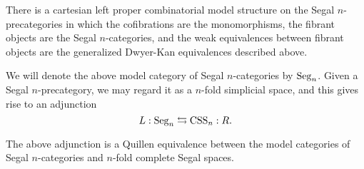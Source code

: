\documentclass{amsart}
\begin{document}
\begin{theorem} %
	There is a cartesian left proper combinatorial model structure on the Segal $n$-precategories in which the cofibrations are the monomorphisms, the fibrant objects are the Segal $n$-categories, and the weak equivalences between fibrant objects are the generalized Dwyer-Kan equivalences described above. 
\end{theorem}

\noindent We will denote the above model category of Segal $n$-categories by $\mathrm{Seg}_n$.   Given a Segal $n$-precategory, we may regard it as a $n$-fold simplicial space, and this gives rise to an adjunction 
\begin{equation} \label{Eqn-SegCSS}
	L:\mathrm{Seg}_n \leftrightarrows \mathrm{CSS}_n:R.
\end{equation}
\begin{theorem} \label{thm:SegnCSSnQuillenEquiv}
	The above adjunction is a Quillen equivalence between the model categories of Segal $n$-categories and $n$-fold complete Segal spaces. 
\end{theorem}
\end{document}
